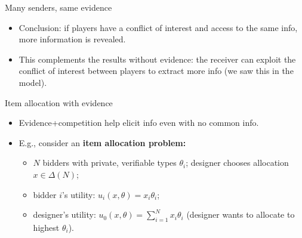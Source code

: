 \documentclass[english,10pt
,aspectratio=169
]{beamer}
\begin{document}
\begin{frame}{Many senders, same evidence}
\begin{itemize}
	\item Conclusion: if players have a \alert{conflict of interest} and access to the same info, \alert{more information} is revealed. 
	
	\item This complements the results without evidence: the receiver can exploit the conflict of interest between players to extract more info (we saw this in the \cite{battaglini_multiple_2002} model).
\end{itemize}
\end{frame}


\begin{frame}{Item allocation with evidence \citep*{ben-porath_mechanisms_2019}}
\begin{itemize}
	\item Evidence+competition help elicit info even with no common info.
	\item E.g., consider an \textbf{item allocation problem:} 
	\begin{itemize}
		\item $N$ bidders with private, \alert{verifiable} types $\theta_i$; designer chooses allocation $x \in \varDelta(N)$;
		\item bidder $i$'s utility: $u_i(x,\theta) = x_i \theta_i$;
		\item designer's utility: $u_0(x,\theta) = \sum_{i=1}^N x_i \theta_i$ (designer wants to allocate to highest $\theta_i$).
	\end{itemize}
\end{itemize}
\end{frame}
\end{document}
